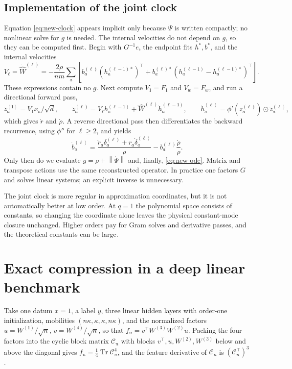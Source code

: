 \documentclass[11pt]{article}
\theoremstyle{definition}
\theoremstyle{remark}
\newcommand{\norm}[1]{\left\lVert #1\right\rVert}
\newcommand{\od}{\mathbin{\odot}}
\begin{document}
\subsection*{Implementation of the joint clock}
\label{app:joint-impl}

Equation \eqref{eq:new-clock} appears implicit only because $\dot\Psi$ is
written compactly; no nonlinear solve for $g$ is needed.  The internal
velocities do not depend on $g$, so they can be computed first.  Begin with
$G^{-1}e$, the endpoint fits $h^*,b^*$, and the internal velocities
\begin{equation}
 V_\ell=\dot{\widehat W}^{(\ell)}=-\frac{2\rho}{nm}\sum_a
 \left[b^{(\ell)}_a(h^{(\ell-1)*}_a)^\top+
 b^{(\ell)*}_a(h^{(\ell-1)}_a-h^{(\ell-1)*}_a)^\top\right]. \label{eq:internal-velocity}
\end{equation}
These expressions contain no $g$.  Next compute $V_1=F_1$ and $V_w=F_w$, and run
a directional forward pass,
\[
 \dot z_a^{(1)}=V_1x_a/\sqrt d,\qquad
 \dot z_a^{(\ell)}=V_\ell h_a^{(\ell-1)}+
 \widehat W^{(\ell)}\dot h_a^{(\ell-1)},\qquad
 \dot h_a^{(\ell)}=\phi'(z_a^{(\ell)})\od\dot z_a^{(\ell)},
\]
which gives $\dot r$ and $\dot\rho$.  A reverse directional pass then
differentiates the backward recurrence, using $\phi''$ for $\ell\ge2$, and
yields
\[
 \dot b^{(\ell)}_a=\frac{\dot r_a\delta_a^{(\ell)}+
 r_a\dot\delta_a^{(\ell)}}{\rho}-b^{(\ell)}_a\frac{\dot\rho}{\rho}.
\]
Only then do we evaluate $g=\rho+\norm{\dot\Psi}$ and, finally,
\eqref{eq:new-ode}.  Matrix and transpose actions use the same reconstructed
operator.  In practice one factors $G$ and solves linear systems; an explicit
inverse is unnecessary.

The joint clock is more regular in approximation coordinates, but it is not
automatically better at low order.  At $q=1$ the polynomial space consists of
constants, so changing the coordinate alone leaves the physical constant-mode
closure unchanged.  Higher orders pay for Gram solves and derivative passes,
and the theoretical constants can be large.

\section{Exact compression in a deep linear benchmark}
\label{app:exact}

Take one datum $x=1$, a label $y$, three linear hidden layers with order-one
initialization, mobilities $(n\kappa,\kappa,\kappa,n\kappa)$, and the normalized
factors $u=W^{(1)}/\sqrt n$, $v=W^{(4)}/\sqrt n$, so that
$f_n=v^\top W^{(3)}W^{(2)}u$.  Packing the four factors into the cyclic block
matrix $\mathcal C_n$ with blocks $v^\top,u,W^{(2)},W^{(3)}$ below and above the
diagonal gives $f_n=\tfrac14\operatorname{Tr}\mathcal C_n^4$, and the feature
derivative of $\mathcal C_n$ is $(\mathcal C_n^\top)^3$.
\end{document}
